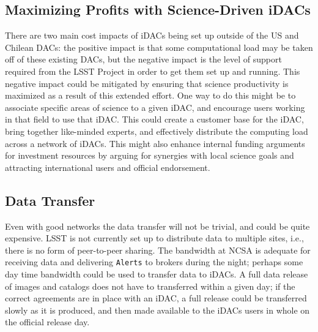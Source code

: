 \subsection{Maximizing Profits with Science-Driven iDACs}
There are two main cost impacts of iDACs being set up outside of the US and Chilean DACs: the positive impact is that some computational load may be taken off of these existing DACs, but the negative impact is the level of support required from the LSST Project in order to get them set up and running. This negative impact could be mitigated by ensuring that science productivity is maximized as a result of this extended effort. One way to do this might be to associate specific areas of science to a given iDAC, and encourage users working in that field to use that iDAC. This could create a customer base for the iDAC, bring together like-minded experts, and effectively distribute the computing load across a network of iDACs. This might also enhance internal funding arguments for investment resources by arguing for synergies with local science goals and attracting international users and official endorsement.


\subsection{Data Transfer}
Even with good networks the data transfer will not be trivial, and could be quite expensive. LSST is not currently set up to distribute data to multiple sites, i.e., there is no form of peer-to-peer sharing. The bandwidth at NCSA is adequate for receiving data and delivering {\tt Alerts} to brokers during the night; perhaps some day time bandwidth could be used to transfer data to iDACs. A full data release of images and catalogs does not have to transferred within a given day; if the correct agreements are in place with an iDAC, a full release could be transferred slowly as it is produced, and then made available to the iDACs users in whole on the official release day.

